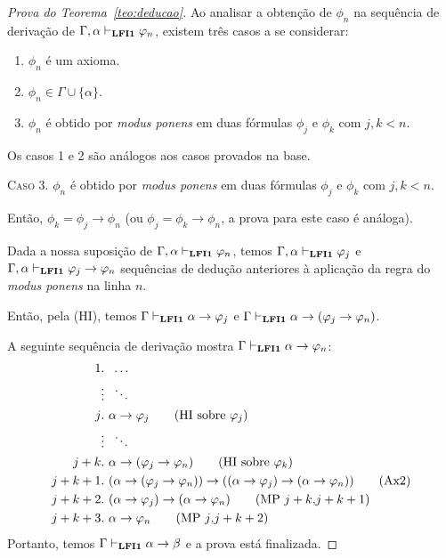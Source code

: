 \begin{proof}[Prova do Teorema~\ref{teo:deducao}]
        Ao analisar a obtenção de $\phi_{n}$ na sequência de derivação de $\Gamma, \alpha\vdash_{{\normalfont\textbf{LFI1}}{}} \varphi_{n}$, existem três casos a se considerar:
        \begin{enumerate}
            \item $\phi_{n}$ é um axioma.
            \item $\phi_{n} \in \Gamma \cup \{\alpha\}$.
            \item $\phi_{n}$ é obtido por \textit{modus ponens} em duas fórmulas $\phi_{j}$ e $\phi_{k}$ com $j, k < n$.
        \end{enumerate}
        
         Os casos 1 e 2 são análogos aos casos provados na base.

         \noindent \textsc{Caso 3.} $\phi_{n}$ é obtido por \textit{modus ponens} em duas fórmulas $\phi_{j}$ e $\phi_{k}$ com $j, k < n$. 
         
         Então, $\phi_{k} = \phi_{j} \to \phi_{n}$ (ou $\phi_{j} = \phi_{k} \to \phi_{n}$, a prova para este caso é análoga). 
         
         Dada a nossa suposição de $\Gamma, \alpha \vdash_{{\normalfont\textbf{LFI1}}{}} \varphi_{n}$, temos $\Gamma, \alpha \vdash_{{\normalfont\textbf{LFI1}}{}} \varphi_{j}$ e $\Gamma, \alpha \vdash_{{\normalfont\textbf{LFI1}}{}} \varphi_{j} \to \varphi_{n}$ sequências de dedução anteriores à aplicação da regra do \textit{modus ponens} na linha $n$. 
         
         Então, pela (HI), temos $\Gamma \vdash_{{\normalfont\textbf{LFI1}}{}} \alpha \to \varphi_{j}$ e $\Gamma \vdash_{{\normalfont\textbf{LFI1}}{}} \alpha \to (\varphi_{j} \to \varphi_{n})$. 
         
         A seguinte sequência de derivação mostra $\Gamma \vdash_{{\normalfont\textbf{LFI1}}{}} \alpha \to \varphi_{n}$:
         \begin{align*}
             \text{1}&.~ \; \ldots\\
             &\vdots \; ~\ddots\\
             \text{$j$}&.~ \alpha \to \phi_{j} \tag{HI sobre $\phi_{j}$}\\
             &\vdots \; ~\ddots\\
             \text{$j + k$}&.~ \alpha \to (\phi_{j} \to \phi_{n}) \tag{HI sobre $\phi_{k}$}\\
             \text{$j + k + 1$}&.~ (\alpha \to (\phi_{j} \to \phi_{n})) \to ((\alpha \to \phi_{j}) \to (\alpha \to \phi_{n})) \tag{Ax2}\\
             \text{$j + k + 2$}&.~ (\alpha \to \phi_{j}) \to (\alpha \to \phi_{n}) \tag{MP $j + k$\text{,}$j + k + 1$}\\
              \text{$j + k + 3$}&.~ \alpha \to \phi_{n} \tag{MP $j$\text{,}$j + k + 2$}
         \end{align*}
         Portanto, temos $\Gamma \vdash_{{\normalfont\textbf{LFI1}}{}} \alpha \to \beta$ e a prova está finalizada.
         
    \end{proof}



